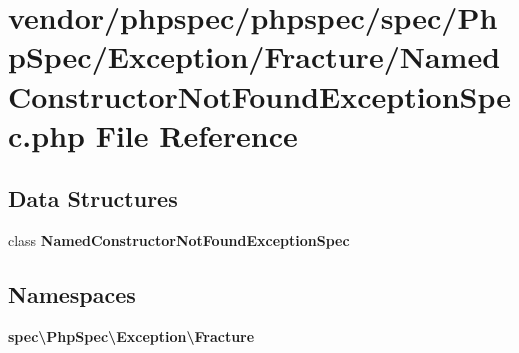 \section{vendor/phpspec/phpspec/spec/\+Php\+Spec/\+Exception/\+Fracture/\+Named\+Constructor\+Not\+Found\+Exception\+Spec.php File Reference}
\label{_named_constructor_not_found_exception_spec_8php}
\subsection*{Data Structures}
\begin{DoxyCompactItemize}
\item 
class {\bf Named\+Constructor\+Not\+Found\+Exception\+Spec}
\end{DoxyCompactItemize}
\subsection*{Namespaces}
\begin{DoxyCompactItemize}
\item 
 {\bf spec\textbackslash{}\+Php\+Spec\textbackslash{}\+Exception\textbackslash{}\+Fracture}
\end{DoxyCompactItemize}
